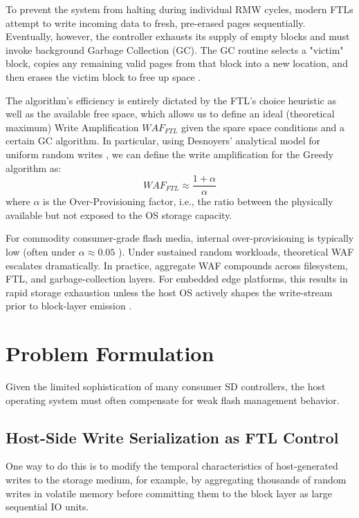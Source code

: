 \documentclass[conference]{IEEEtran}
\begin{document}
To prevent the system from halting during individual RMW cycles, modern FTLs attempt to write incoming data to fresh, pre-erased pages sequentially. Eventually, however, the controller exhausts its supply of empty blocks and must invoke background Garbage Collection (GC). The GC routine selects a "victim" block, copies any remaining valid pages from that block into a new location, and then erases the victim block to free up space \cite{b27}.

The algorithm’s efficiency is entirely dictated by the FTL’s choice heuristic as well as the available free space, which allows us to define an ideal (theoretical maximum) Write Amplification $WAF_{FTL}$ given the spare space conditions and a certain GC algorithm. In particular, using Desnoyers’ analytical model for uniform random writes \cite{b8}, we can define the write amplification for the Greedy algorithm as:
\begin{equation}
WAF_{FTL} \approx \frac{1 + \alpha}{\alpha}
\end{equation}
where $\alpha$ is the Over-Provisioning factor, i.e., the ratio between the physically available but not exposed to the OS storage capacity.

For commodity consumer-grade flash media, internal over-provisioning is typically low (often under $\alpha \approx 0.05$ \cite{b25}). Under sustained random workloads, theoretical WAF escalates dramatically. In practice, aggregate WAF compounds across filesystem, FTL, and garbage-collection layers. For embedded edge platforms, this results in rapid storage exhaustion unless the host OS actively shapes the write-stream prior to block-layer emission \cite{b9}.

\section{Problem Formulation}

Given the limited sophistication of many consumer SD controllers, the host operating system must often compensate for weak flash management behavior.

\subsection{Host-Side Write Serialization as FTL Control}
One way to do this is to modify the temporal characteristics of host-generated writes to the storage medium, for example, by aggregating thousands of random writes in volatile memory before committing them to the block layer as large sequential IO units.
\end{document}
